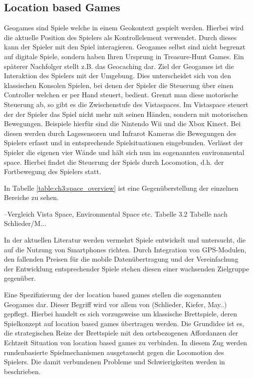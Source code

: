 \subsection*{Location based Games}

Geogames sind Spiele welche in einem Geokontext gespielt werden. Hierbei wird die aktuelle Position des Spielers als Kontrollelement verwendet\citep{Schlieder.2006}. Durch dieses kann der Spieler mit den Spiel interagieren.
Geogames selbst sind nicht begrenzt auf digitale Spiele, sondern haben Ihren Ursprung in Treasure-Hunt Games. Ein späterer Nachfolger stellt z.B. das Geocaching dar.
Ziel der Geogames ist die Interaktion des Spielers mit der Umgebung. Dies unterscheidet sich von den klassischen Konsolen Spielen, bei denen der Spieler die Steuerung über einen Controller welchen er per Hand steuert, bedient. Grenzt man diese motorische Steuerung ab, so gibt es die Zwischenstufe des Vistaspaces. Im Vistaspace steuert der der Spieler das Spiel nicht mehr mit seinen Händen, sondern mit motorischen Bewegungen. Beispiele hierfür sind die Nintendo Wii und die Xbox Kinect. Bei diesen werden durch Lagesensoren und Infrarot Kameras die Bewegungen des Spielers erfasst und in entsprechende Spielsituationen eingebunden.
Verlässt der Spieler die eigenen vier Wände und hält sich nun im sogenannten environmental space.
Hierbei findet die Steuerung der Spiels durch Locomotion, d.h. der Fortbewegung des Spielers statt. \cite{Benford.2003,Kiefer.2007}

In Tabelle \ref{table:ch3:space_overview} ist eine Gegenüberstellung der einzelnen Bereiche zu sehen.

--Vergleich Vista Space, Environmental Space etc. Tabelle 3.2
Tabelle nach Schlieder/M...
\label{table:ch3:space_overview}

In der aktuellen Literatur werden vermehrt Spiele entwickelt und untersucht, die auf die Nutzung von Smartphones richten. \cite{Rashid.2006a}
Durch Integration von GPS-Modulen, den fallenden Preisen für die mobile Datenübertragung und der Vereinfachung der Entwicklung entsprechender Spiele stehen diesen einer wachsenden Zielgruppe gegenüber.

Eine Spezifizierung der der location based games stellen die sogenannten Geogames dar. Dieser Begriff wird vor allem von (Schlieder, Kiefer, May..) gepflegt. Hierbei handelt es sich vorzugsweise um klassische Brettspiele, deren Spielkonzept auf location based games übertragen werden. Die Grundidee ist es, die strategischen Reize der Brettspiele mit den ortsbezogenen Affordanzen der Echtzeit Situation von location based games zu verbinden. In diesem Zug werden rundenbasierte Spielmechanismen ausgetauscht gegen die Locomotion des Spielers. Die damit verbundenen Probleme und Schwierigkeiten werden in \cite{Schlieder.2006} beschrieben.

